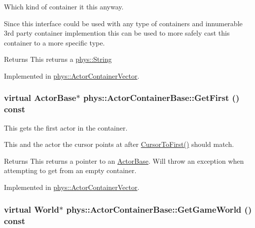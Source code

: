 Which kind of container it this anyway. 

Since this interface could be used with any type of containers and innumerable 3rd party container implemention this can be used to more safely cast this container to a more specific type. \begin{DoxyReturn}{Returns}
This returns a \hyperlink{namespacephys_aa03900411993de7fbfec4789bc1d392e}{phys::String} 
\end{DoxyReturn}


Implemented in \hyperlink{classphys_1_1ActorContainerVector_ae18c29b30d840e0f4fc9b553dd5ca32c}{phys::ActorContainerVector}.

\hypertarget{classphys_1_1ActorContainerBase_ae703482d84a9c6726e28a8f26418b161}{
\subsubsection[{GetFirst}]{\setlength{\rightskip}{0pt plus 5cm}virtual {\bf ActorBase}$\ast$ phys::ActorContainerBase::GetFirst () const}}
\label{d1/d00/classphys_1_1ActorContainerBase_ae703482d84a9c6726e28a8f26418b161}


This gets the first actor in the container. 

This and the actor the cursor points at after \hyperlink{classphys_1_1ActorContainerBase_ab1a44758d7c17e70ff2e0f8de47424c3}{CursorToFirst()} should match. \begin{DoxyReturn}{Returns}
This returns a pointer to an \hyperlink{classphys_1_1ActorBase}{ActorBase}. Will throw an exception when attempting to get from an empty container. 
\end{DoxyReturn}


Implemented in \hyperlink{classphys_1_1ActorContainerVector_a55ceecd017455f3185aa62798811e3c6}{phys::ActorContainerVector}.

\hypertarget{classphys_1_1ActorContainerBase_a479e6c7434f2611b0cfe6ca1fd4ebdd1}{
\subsubsection[{GetGameWorld}]{\setlength{\rightskip}{0pt plus 5cm}virtual {\bf World}$\ast$ phys::ActorContainerBase::GetGameWorld () const}}
\label{d1/d00/classphys_1_1ActorContainerBase_a479e6c7434f2611b0cfe6ca1fd4ebdd1}


